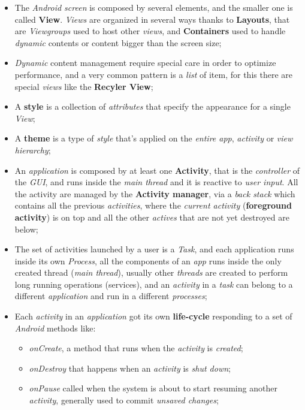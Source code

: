 \documentclass{article}
\begin{document}
\begin{itemize}
\item The \emph{Android screen} is composed by several elements, and the smaller one is called \textbf{View}. \emph{Views} are organized in several ways thanks to \textbf{Layouts}, that are \emph{Viewgroups} used to host other \emph{views}, and \textbf{Containers} used to handle \emph{dynamic} contents or content bigger than the screen size;
\item \emph{Dynamic} content management require special care in order to optimize performance, and a very common pattern is a \emph{list} of item, for this there are special \emph{views} like the \textbf{Recyler View};
\item A \textbf{style} is a collection of \emph{attributes} that specify the appearance for a single \emph{View};
\item A \textbf{theme} is a type of \emph{style} that's applied on the\emph{ entire app}, \emph{activity} or \emph{view hierarchy};
\item An \emph{application} is composed by at least one \textbf{Activity}, that is the \emph{controller} of the \emph{GUI}, and runs inside the\emph{ main thread} and it is reactive to \emph{user input}. All the activity are managed by the \textbf{Activity manager}, via a \emph{back stack} which contains all the previous \emph{activities}, where the \emph{current activity} (\textbf{foreground activity}) is on top and all the other \emph{actives} that are not yet destroyed are below;
\item The set of activities launched by a user is a \emph{Task}, and each application runs inside its own \emph{Process}, all the components of an \emph{app} runs inside the only created thread (\emph{main thread}), usually other \emph{threads} are created to perform long running operations (services), and an \emph{activity} in a \emph{task} can belong to a different \emph{application} and run in a different \emph{processes};
\item Each \emph{activity} in an \emph{application} got its own \textbf{life-cycle} responding to a set of \emph{Android} methods like:
\begin{itemize}
\item \emph{onCreate}, a method that runs when the \emph{activity} is \emph{created};
\item \emph{onDestroy} that happens when an \emph{activity} is \emph{shut down};
\item \emph{onPause} called when the system is about to start resuming another \emph{activity}, generally used to commit \emph{unsaved changes};

\end{itemize}
\end{itemize}
\end{document}
